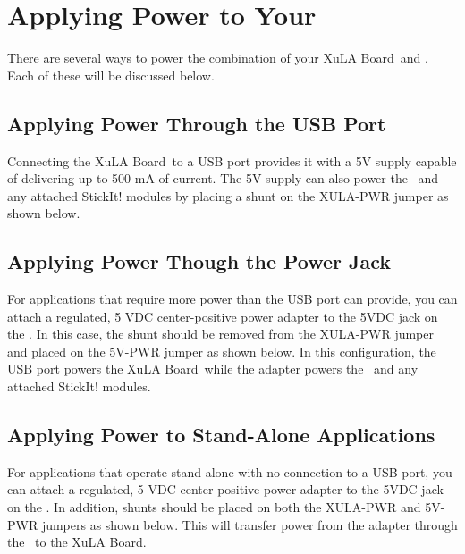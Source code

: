 \documentclass[letterpaper,11pt,oneside]{memoir}
\newcommand{\xula}{XuLA Board}
\renewcommand{\fixedpic}[1]{}
\begin{document}
\section{Applying Power to Your \texorpdfstring{\product}{StickIt! Board}}

There are several ways to power the combination of your \xula\ and \product.
Each of these will be discussed below.

\subsection{Applying Power Through the USB Port}

Connecting the \xula\ to a USB port provides it with a 5V supply capable of
delivering up to 500 mA of current.
The 5V supply can also power the \product\ and any attached StickIt! modules by 
placing a shunt on the XULA-PWR jumper as shown below.

\fixedpic{\texttt{[image: XULA\_PWR.jpg]}}

\pagebreak %

\subsection{Applying Power Though the Power Jack}

For applications that require more power than the USB port can provide, you can
attach a regulated, 5 VDC center-positive power adapter to the 5VDC jack on the
\product. 
In this case, the shunt should be removed from the XULA-PWR
jumper and placed on the 5V-PWR jumper as shown below. 
In this configuration, the USB port powers the \xula\ while the adapter powers
the \product\ and any attached StickIt! modules.

\fixedpic{\texttt{[image: 5V\_PWR.jpg]}}

\pagebreak %

\subsection{Applying Power to Stand-Alone Applications}

For applications that operate stand-alone with no connection to a USB port, you
can attach a regulated, 5 VDC center-positive power adapter to the 5VDC jack on
the \product. 
In addition, shunts should be placed on both the XULA-PWR
and 5V-PWR jumpers as shown below. 
This will transfer power from the adapter through the \product\ to the \xula.
\end{document}
